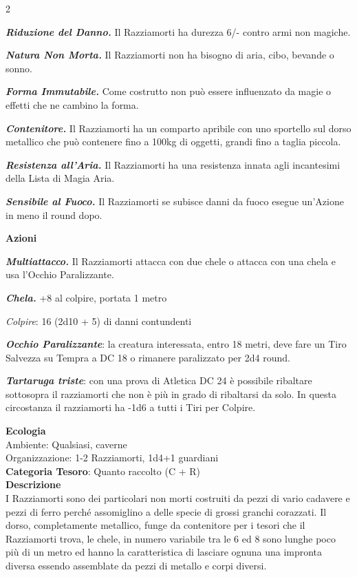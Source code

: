 \begin{multicols}{2}
{\emph{\textbf{Riduzione del Danno.}} Il Razziamorti ha durezza 6/- contro armi non magiche.

\emph{\textbf{Natura Non Morta.}} Il Razziamorti non ha bisogno di aria, cibo, bevande o sonno.

\emph{\textbf{Forma Immutabile.}} Come costrutto non può essere influenzato da magie o effetti che ne cambino la forma.

\emph{\textbf{Contenitore.}} Il Razziamorti ha un comparto apribile con uno sportello sul dorso metallico che può contenere fino a 100kg di oggetti, grandi fino a taglia piccola.

\emph{\textbf{Resistenza all'Aria.}} Il Razziamorti ha una resistenza innata agli incantesimi della Lista di Magia Aria.

\emph{\textbf{Sensibile al Fuoco.}} Il Razziamorti se subisce danni da fuoco esegue un'Azione in meno il round dopo.

\textbf{Azioni}

\emph{\textbf{Multiattacco.}} Il Razziamorti attacca con due chele o attacca con una chela e usa l'Occhio Paralizzante.

\textbf{\emph{Chela.}} +8 al colpire, portata 1 metro

\emph{Colpire}: 16 (2d10 + 5) di danni contundenti

\emph{\textbf{Occhio Paralizzante}}: la creatura interessata, entro 18 metri, deve fare un Tiro Salvezza su Tempra a DC 18 o rimanere paralizzato per 2d4 round.

\emph{\textbf{Tartaruga triste}}: con una prova di Atletica DC 24 è possibile ribaltare sottosopra il razziamorti che non è più in grado di ribaltarsi da solo. In questa circostanza il razziamorti ha -1d6 a tutti i Tiri per Colpire.

\textbf{Ecologia}\\
Ambiente: Qualsiasi, caverne\\
Organizzazione: 1-2 Razziamorti, 1d4+1 guardiani\\
\textbf{Categoria Tesoro}: Quanto raccolto (C + R)\\
\textbf{Descrizione}\\
I Razziamorti sono dei particolari non morti costruiti da pezzi di vario cadavere e pezzi di ferro perché assomiglino a delle specie di grossi granchi corazzati.
Il dorso, completamente metallico, funge da contenitore per i tesori che il Razziamorti trova, le chele, in numero variabile tra le 6 ed 8 sono lunghe poco più di un metro ed hanno la caratteristica di lasciare ognuna una impronta diversa essendo assemblate da pezzi di metallo e corpi diversi.

}
\end{multicols}
